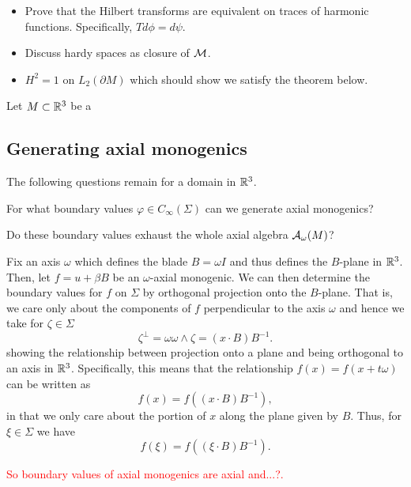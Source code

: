 \documentclass[12pt]{article}
\begin{document}
\begin{itemize}
    \item Prove that the Hilbert transforms are equivalent on traces of harmonic functions. Specifically, $Td\phi = d\psi$.  
    \item Discuss hardy spaces as closure of $\mathcal{M}$. 
    \item $H^2=1$ on $L_2(\partial M)$ which should show we satisfy the theorem below.
\end{itemize}

Let $M\subset \mathbb{R}^3$ be a 

\subsection{Generating axial monogenics}

The following questions remain for a domain in $\mathbb{R}^3$.

\begin{question}
    For what boundary values $\varphi \in C_\infty(\Sigma)$ can we generate axial monogenics?
\end{question}

\begin{question}
    Do these boundary values exhaust the whole axial algebra $\mathcal{A}_{\omega}(M)$?
\end{question}

Fix an axis $\omega$ which defines the blade $B = \omega I$ and thus defines the $B$-plane in $\mathbb{R}^3$.  Then, let $f=u+\beta B$ be an $\omega$-axial monogenic.  We can then determine the boundary values for $f$ on $\Sigma$ by orthogonal projection onto the $B$-plane.  That is, we care only about the components of $f$ perpendicular to the axis $\omega$ and hence we take for $\zeta \in \Sigma$
\[
\zeta^\perp = \omega \omega \wedge \zeta = (x\cdot B)B^{-1}.
\]
showing the relationship between projection onto a plane and being orthogonal to an axis in $\mathbb{R}^3$. Specifically, this means that the relationship $f(x)=f(x+t\omega)$ can be written as
\[
f(x)=f((x\cdot B)B^{-1}),
\]
in that we only care about the portion of $x$ along the plane given by $B$.  Thus, for $\xi \in \Sigma$ we have
\[
f(\xi) = f((\xi \cdot B)B^{-1}).
\]

\begin{figure}[H]
	\centering
	\resizebox{\columnwidth}{!}{}
\end{figure}

\textcolor{red}{So boundary values of axial monogenics are axial and...?.}
\end{document}
